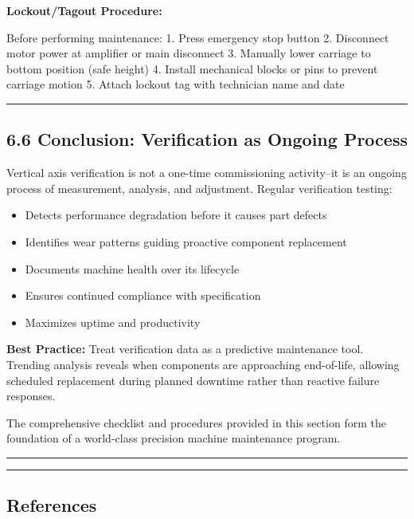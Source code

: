 \documentclass[
]{article}
\providecommand{\tightlist}{%
  \setlength{\itemsep}{0pt}\setlength{\parskip}{0pt}}
\begin{document}
\textbf{Lockout/Tagout Procedure:}

Before performing maintenance: 1. Press emergency stop button 2.
Disconnect motor power at amplifier or main disconnect 3. Manually lower
carriage to bottom position (safe height) 4. Install mechanical blocks
or pins to prevent carriage motion 5. Attach lockout tag with technician
name and date

\begin{center}\rule{0.5\linewidth}{0.5pt}\end{center}

\subsection{6.6 Conclusion: Verification as Ongoing
Process}\label{conclusion-verification-as-ongoing-process}

Vertical axis verification is not a one-time commissioning activity--it
is an ongoing process of measurement, analysis, and adjustment. Regular
verification testing:

\begin{itemize}
\tightlist
\item
  Detects performance degradation before it causes part defects
\item
  Identifies wear patterns guiding proactive component replacement
\item
  Documents machine health over its lifecycle
\item
  Ensures continued compliance with specification
\item
  Maximizes uptime and productivity
\end{itemize}

\textbf{Best Practice:} Treat verification data as a predictive
maintenance tool. Trending analysis reveals when components are
approaching end-of-life, allowing scheduled replacement during planned
downtime rather than reactive failure responses.

The comprehensive checklist and procedures provided in this section form
the foundation of a world-class precision machine maintenance program.

\begin{center}\rule{0.5\linewidth}{0.5pt}\end{center}

\begin{center}\rule{0.5\linewidth}{0.5pt}\end{center}

\subsection{References}\label{references-4}
\end{document}
